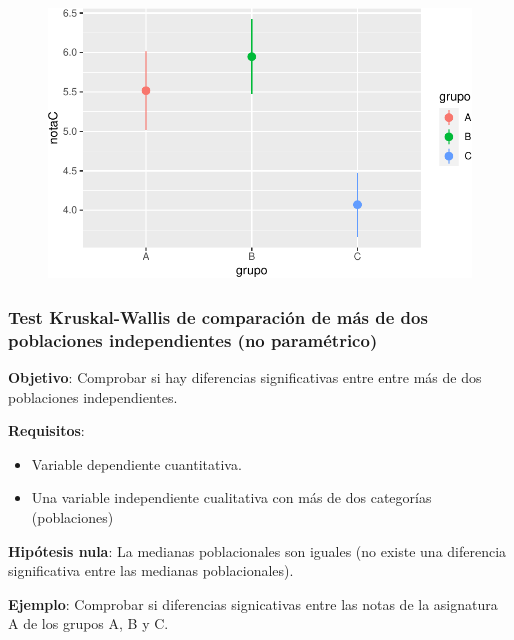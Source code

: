 \documentclass[
  a4paper,
]{scrreport}
\providecommand{\tightlist}{%
  \setlength{\itemsep}{0pt}\setlength{\parskip}{0pt}}\usepackage{longtable,booktabs,array}
\theoremstyle{definition}
\theoremstyle{definition}
\theoremstyle{remark}
\begin{document}
\begin{figure}[H]

{\centering \includegraphics{./08-analisis-estadisticos_files/figure-pdf/unnamed-chunk-54-1.pdf}

}

\end{figure}

\hypertarget{test-kruskal-wallis-de-comparaciuxf3n-de-muxe1s-de-dos-poblaciones-independientes-no-paramuxe9trico}{%
\subsubsection{Test Kruskal-Wallis de comparación de más de dos
poblaciones independientes (no
paramétrico)}\label{test-kruskal-wallis-de-comparaciuxf3n-de-muxe1s-de-dos-poblaciones-independientes-no-paramuxe9trico}}

\textbf{Objetivo}: Comprobar si hay diferencias significativas entre
entre más de dos poblaciones independientes.

\textbf{Requisitos}:

\begin{itemize}
\tightlist
\item
  Variable dependiente cuantitativa.
\item
  Una variable independiente cualitativa con más de dos categorías
  (poblaciones)
\end{itemize}

\textbf{Hipótesis nula}: La medianas poblacionales son iguales (no
existe una diferencia significativa entre las medianas poblacionales).

\textbf{Ejemplo}: Comprobar si diferencias signicativas entre las notas
de la asignatura A de los grupos A, B y C.
\end{document}
